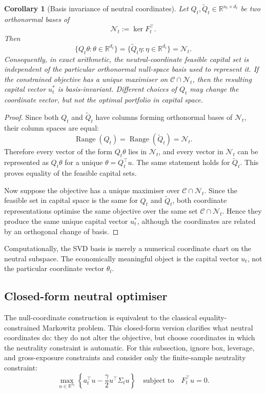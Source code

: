 \documentclass[11pt]{article}
\newtheorem{corollary}{Corollary}
\newcommand{\R}{\mathbb{R}}
\newcommand{\N}{\mathcal{N}}
\begin{document}
\begin{corollary}[Basis invariance of neutral coordinates]
\label{cor:basis-invariance}
Let $Q_t,\widetilde Q_t\in\R^{n_t\times d_t}$ be two orthonormal bases of
\[
        \N_t:=\ker F_t^\top.
\]
Then
\[
        \{Q_t\theta:\theta\in\R^{d_t}\}
        =\{\widetilde Q_t\eta:\eta\in\R^{d_t}\}=\N_t.
\]
Consequently, in exact arithmetic, the neutral-coordinate feasible capital set is independent of the particular
orthonormal null-space basis used to represent it.  If the constrained objective has a unique maximiser
on $\mathcal C\cap\N_t$, then the resulting capital vector $u_t^\ast$ is basis-invariant.  Different
choices of $Q_t$ may change the coordinate vector, but not the optimal portfolio in capital space.
\end{corollary}

\begin{proof}
Since both $Q_t$ and $\widetilde Q_t$ have columns forming orthonormal bases of $\N_t$, their column
spaces are equal:
\[
        \operatorname{Range}(Q_t)=\operatorname{Range}(\widetilde Q_t)=\N_t.
\]
Therefore every vector of the form $Q_t\theta$ lies in $\N_t$, and every vector in $\N_t$ can be
represented as $Q_t\theta$ for a unique $\theta=Q_t^\top u$.  The same statement holds for
$\widetilde Q_t$.  This proves equality of the feasible capital sets.

Now suppose the objective has a unique maximiser over $\mathcal C\cap\N_t$.  Since the feasible set in
capital space is the same for $Q_t$ and $\widetilde Q_t$, both coordinate representations optimise the
same objective over the same set $\mathcal C\cap\N_t$.  Hence they produce the same unique capital
vector $u_t^\ast$, although the coordinates are related by an orthogonal change of basis.
\end{proof}

Computationally, the SVD basis is merely a numerical coordinate chart on the
neutral subspace.  The economically meaningful object is the capital vector $u_t$, not the particular
coordinate vector $\theta_t$.

\subsection{Closed-form neutral optimiser}

The null-coordinate construction is equivalent to the classical equality-constrained Markowitz problem.
This closed-form version clarifies what neutral coordinates do: they do not alter the objective, but
choose coordinates in which the neutrality constraint is automatic.  For this subsection, ignore box,
leverage, and gross-exposure constraints and consider only the finite-sample neutrality constraint:
\begin{equation}
        \max_{u\in\R^{n_t}}
        \left\{a_t^\top u-\frac{\gamma}{2}u^\top\Sigma_tu\right\}
        \quad \text{subject to}\quad F_t^\top u=0.
\end{equation}
\end{document}
